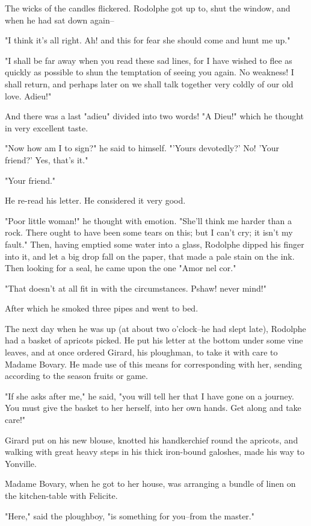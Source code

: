 \documentclass[11pt,twocolumn]{ltugboat}
\begin{document}
The wicks of the candles flickered. Rodolphe got up to, shut the window,
and when he had sat down again--

"I think it's all right. Ah! and this for fear she should come and hunt
me up."

"I shall be far away when you read these sad lines, for I have wished to
flee as quickly as possible to shun the temptation of seeing you again.
No weakness! I shall return, and perhaps later on we shall talk together
very coldly of our old love. Adieu!"

And there was a last "adieu" divided into two words! "A Dieu!" which he
thought in very excellent taste.

"Now how am I to sign?" he said to himself. "'Yours devotedly?' No!
'Your friend?' Yes, that's it."

"Your friend."

He re-read his letter. He considered it very good.

"Poor little woman!" he thought with emotion. "She'll think me harder
than a rock. There ought to have been some tears on this; but I can't
cry; it isn't my fault." Then, having emptied some water into a glass,
Rodolphe dipped his finger into it, and let a big drop fall on the
paper, that made a pale stain on the ink. Then looking for a seal, he
came upon the one "Amor nel cor."

"That doesn't at all fit in with the circumstances. Pshaw! never mind!"

After which he smoked three pipes and went to bed.

The next day when he was up (at about two o'clock--he had slept late),
Rodolphe had a basket of apricots picked. He put his letter at
the bottom under some vine leaves, and at once ordered Girard, his
ploughman, to take it with care to Madame Bovary. He made use of this
means for corresponding with her, sending according to the season fruits
or game.

"If she asks after me," he said, "you will tell her that I have gone on
a journey. You must give the basket to her herself, into her own hands.
Get along and take care!"

Girard put on his new blouse, knotted his handkerchief round the
apricots, and walking with great heavy steps in his thick iron-bound
galoshes, made his way to Yonville.

Madame Bovary, when he got to her house, was arranging a bundle of linen
on the kitchen-table with Felicite.

"Here," said the ploughboy, "is something for you--from the master."
\end{document}
